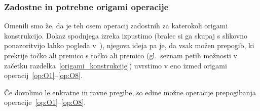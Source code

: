 
\subsubsection*{Zadostne in potrebne origami operacije}
\label{podpogl:zadost_potr_op}

Omenili smo že, da je teh osem operacij zadostnih za katerokoli origami konstrukcijo. Dokaz spodnjega izreka izpustimo (bralec si ga skupaj s slikovno ponazoritvijo lahko pogleda v~\cite[str.\ 24--26 (izrek 1.1)]{hull2020}), njegova ideja pa je, da vsak možen prepogib, ki prekrije točko ali premico s točko ali premico (gl.\ seznam petih možnosti v začetku razdelka~\ref{origami_konstrukcije}) uvrstimo v eno izmed origami operacij~\ref{op:O1}--\ref{op:O8}.

\begin{izrek}
    \label{izr:op1do8}
    Če dovolimo le enkratne in ravne pregibe, so edine možne operacije prepogibanja operacije~\ref{op:O1}--\ref{op:O8}.
\end{izrek}

